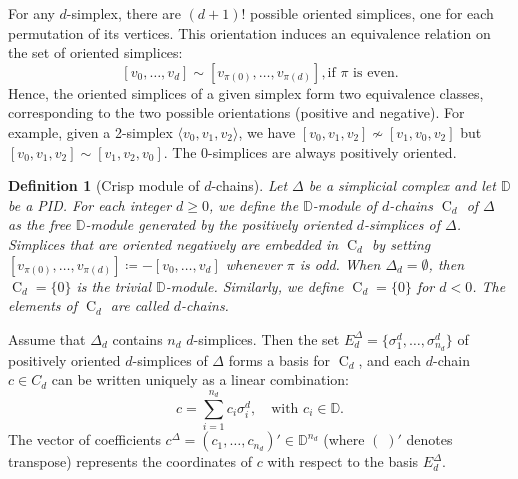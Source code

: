 \documentclass[a4paper,10pt]{article}
\newtheorem{definition}[theorem]{Definition}
\newcommand{\bbd}{\mathbb{D}}
\newcommand{\E}{E^\Delta}
\DeclareMathOperator{\Co}{C}
\begin{document}
For any \(d\)-simplex, there are \((d\!+\!1)!\) possible oriented simplices, one for each permutation of its vertices. This orientation induces an equivalence relation on the set of oriented simplices:  
\[
[v_0, \dots, v_d] \sim [v_{\pi(0)}, \dots, v_{\pi(d)}],  \text{if } \pi \text{ is even}.
\]
Hence, the oriented simplices of a given simplex form two equivalence classes, corresponding to the two possible orientations (positive and negative). 
For example, given a 2-simplex \(\langle v_0, v_1, v_2 \rangle\), we have 
\([v_0, v_1, v_2]  \not \sim [v_1, v_0, v_2]\) but
\([v_0, v_1, v_2] \sim [v_1, v_2, v_0]\).
The \(0\)-simplices are always positively oriented.

\begin{definition}[Crisp module of \(d\)-chains]
\label{def:chain}
Let \(\Delta\) be a simplicial complex and let \(\bbd\) be a PID. For each integer \(d \geq 0\), we define the \(\bbd\)-module of \(d\)-chains \(\Co_d\) of \(\Delta\) as the free \(\bbd\)-module generated by the positively oriented \(d\)-simplices of \(\Delta\). 
Simplices that are oriented negatively are embedded in \(\Co_d\) by setting 
\(
[v_{\pi(0)}, \dots, v_{\pi(d)}] \coloneqq -[v_0, \dots, v_d]
\) whenever \(\pi\) is odd.
When \(\Delta_d = \emptyset\), then \(\Co_d = \{0\}\) is the trivial \(\bbd\)-module. Similarly, we define \(\Co_d = \{0\}\) for \(d<0\). The elements of \(\Co_d\) are called \emph{\(d\)-chains}.
\end{definition}

Assume that \(\Delta_d\) contains \(n_d\) \(d\)-simplices. Then the set \(\E_d = \{\sigma^{d}_{1}, \dots, \sigma^{d}_{n_d}\}\) of positively oriented \(d\)-simplices of \(\Delta\) forms a basis for \(\Co_d\), and each \(d\)-chain \(c \in C_d\) can be written uniquely as a linear combination:
\[
c = \sum_{i=1}^{n_d} c_i \sigma^{d}_{i}, \quad \text{with } c_i \in \bbd.
\]
The vector of coefficients \(c^{\Delta} = (c_1, \dots, c_{n_d})' \in \bbd^{n_d}\) 
(where \( (\;)'\)  denotes transpose)
represents the coordinates of \(c\) with respect to the basis \(\E_d\).
\end{document}
